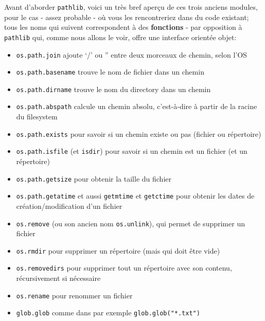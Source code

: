 Avant d'aborder \texttt{pathlib}, voici un très bref aperçu de ces trois
anciens modules, pour le cas - assez probable - où vous les
rencontreriez dans du code existant; tous les noms qui suivent
correspondent à des \textbf{fonctions} - par opposition à
\texttt{pathlib} qui, comme nous allons le voir, offre une interface
orientée objet:

    \begin{itemize}
\tightlist
\item
  \texttt{os.path.join} ajoute `/' ou '' entre deux morceaux de chemin,
  selon l'OS
\item
  \texttt{os.path.basename} trouve le nom de fichier dans un chemin
\item
  \texttt{os.path.dirname} trouve le nom du directory dans un chemin
\item
  \texttt{os.path.abspath} calcule un chemin absolu, c'est-à-dire à
  partir de la racine du filesystem
\end{itemize}

    \begin{itemize}
\tightlist
\item
  \texttt{os.path.exists} pour savoir si un chemin existe ou pas
  (fichier ou répertoire)
\item
  \texttt{os.path.isfile} (et \texttt{isdir}) pour savoir si un chemin
  est un fichier (et un répertoire)
\item
  \texttt{os.path.getsize} pour obtenir la taille du fichier
\item
  \texttt{os.path.getatime} et aussi \texttt{getmtime} et
  \texttt{getctime} pour obtenir les dates de création/modification d'un
  fichier
\end{itemize}

    \begin{itemize}
\tightlist
\item
  \texttt{os.remove} (ou son ancien nom \texttt{os.unlink}), qui permet
  de supprimer un fichier
\item
  \texttt{os.rmdir} pour supprimer un répertoire (mais qui doit être
  vide)
\item
  \texttt{os.removedirs} pour supprimer tout un répertoire avec son
  contenu, récursivement si nécessaire
\item
  \texttt{os.rename} pour renommer un fichier
\end{itemize}

    \begin{itemize}
\tightlist
\item
  \texttt{glob.glob} comme dans par exemple \texttt{glob.glob("*.txt")}
\end{itemize}

